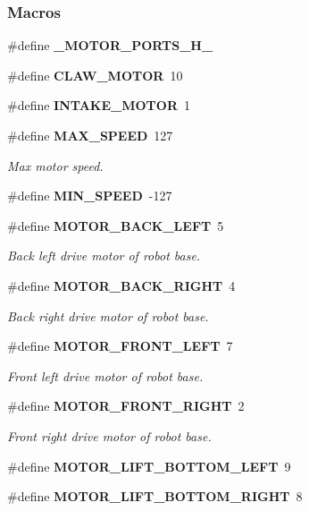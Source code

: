 \subsubsection*{Macros}
\begin{DoxyCompactItemize}
\item 
\#define \textbf{ \+\_\+\+M\+O\+T\+O\+R\+\_\+\+P\+O\+R\+T\+S\+\_\+\+H\+\_\+}
\item 
\#define \textbf{ C\+L\+A\+W\+\_\+\+M\+O\+T\+OR}~10
\item 
\#define \textbf{ I\+N\+T\+A\+K\+E\+\_\+\+M\+O\+T\+OR}~1
\item 
\#define \textbf{ M\+A\+X\+\_\+\+S\+P\+E\+ED}~127
\begin{DoxyCompactList}\small\item\em Max motor speed. \end{DoxyCompactList}\item 
\#define \textbf{ M\+I\+N\+\_\+\+S\+P\+E\+ED}~-\/127
\item 
\#define \textbf{ M\+O\+T\+O\+R\+\_\+\+B\+A\+C\+K\+\_\+\+L\+E\+FT}~5
\begin{DoxyCompactList}\small\item\em Back left drive motor of robot base. \end{DoxyCompactList}\item 
\#define \textbf{ M\+O\+T\+O\+R\+\_\+\+B\+A\+C\+K\+\_\+\+R\+I\+G\+HT}~4
\begin{DoxyCompactList}\small\item\em Back right drive motor of robot base. \end{DoxyCompactList}\item 
\#define \textbf{ M\+O\+T\+O\+R\+\_\+\+F\+R\+O\+N\+T\+\_\+\+L\+E\+FT}~7
\begin{DoxyCompactList}\small\item\em Front left drive motor of robot base. \end{DoxyCompactList}\item 
\#define \textbf{ M\+O\+T\+O\+R\+\_\+\+F\+R\+O\+N\+T\+\_\+\+R\+I\+G\+HT}~2
\begin{DoxyCompactList}\small\item\em Front right drive motor of robot base. \end{DoxyCompactList}\item 
\#define \textbf{ M\+O\+T\+O\+R\+\_\+\+L\+I\+F\+T\+\_\+\+B\+O\+T\+T\+O\+M\+\_\+\+L\+E\+FT}~9
\item 
\#define \textbf{ M\+O\+T\+O\+R\+\_\+\+L\+I\+F\+T\+\_\+\+B\+O\+T\+T\+O\+M\+\_\+\+R\+I\+G\+HT}~8
\item 

\end{DoxyCompactItemize}
